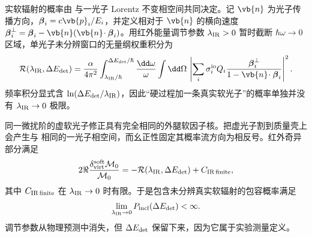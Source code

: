 实软辐射的概率由 与一光子 Lorentz 不变相空间共同决定。记 $\vb{n}$ 为光子传播方向，$\boldsymbol\beta_i=c\vb{p}_i/E_i$，并定义相对于 $\vb{n}$ 的横向速度
$\boldsymbol\beta_i^\perp=\boldsymbol\beta_i-\vb{n}(\vb{n}\!\cdot\boldsymbol\beta_i)$。用红外能量调节参数 $\lambda_{\rm IR}>0$ 暂时截断 $\hbar\omega\to0$ 区域，单光子未分辨窗口的无量纲权重积分为
\begin{equation}
 {
 \mathcal R(\lambda_{\rm IR},\Delta E_{\rm det})
 =\frac{\alpha}{4\pi^2}
 \int_{\lambda_{\rm IR}/\hbar}^{\Delta E_{\rm det}/\hbar}
 \frac{\dd\omega}{\omega}
 \int\dd\Omega\,
 \left|
 \sum_i\sigma_i^{\rm io}Q_i
 \frac{\boldsymbol\beta_i^\perp}
 {1-\vb{n}\!\cdot\boldsymbol\beta_i}
 \right|^2.}
 \label{eq:soft-radiator-definition-dp10}
\end{equation}
频率积分显式含 $\ln(\Delta E_{\rm det}/\lambda_{\rm IR})$，因此“硬过程加一条真实软光子”的概率单独并没有 $\lambda_{\rm IR}\to0$ 极限。

同一微扰阶的虚软光子修正具有完全相同的外腿软因子核。把虚光子割到质量壳上会产生与 相同的一光子相空间，而幺正性固定其概率流方向为相反号。红外奇异部分满足
\begin{equation}
 {
 2\Re\frac{\delta_{\rm virt}^{\rm soft}\mathcal M_0}{\mathcal M_0}
 =-\mathcal R(\lambda_{\rm IR},\Delta E_{\rm det})
 +C_{\rm IR\,finite},}
 \label{eq:virtual-real-ir-relation-dp10}
\end{equation}
其中 $C_{\rm IR\,finite}$ 在 $\lambda_{\rm IR}\to0$ 时有限。于是包含未分辨真实软辐射的包容概率满足
\begin{equation}
 {
 \lim_{\lambda_{\rm IR}\to0}
 P_{\rm incl}(\Delta E_{\rm det})<\infty.}
 \label{eq:bloch-nordsieck-cancellation-dp10}
\end{equation}
调节参数从物理预测中消失，但 $\Delta E_{\rm det}$ 保留下来，因为它属于实验测量定义。

